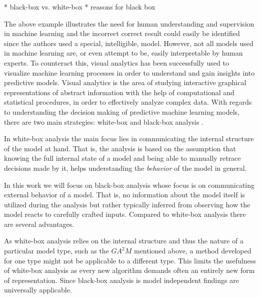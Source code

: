 * black-box vs. white-box
* reasons for black box

The above example illustrates the need for human understanding and supervision in machine learning and the incorrect correct result could easily be identified since the authors used a special, intelligible, model. However, not all models used in machine learning are, or even attempt to be, easily interpretable by human experts. To counteract this, visual analytics has been successfully used to visualize machine learning processes in order to understand and gain insights into predictive models. Visual analytics is the area of studying interactive graphical representations of abstract information with the help of computational and statistical procedures, in order to effectively analyze complex data. With regards to understanding the decision making of predictive machine learning models, there are two main strategies: white-box and black-box analysis \cite{class_signatures}.

In white-box analysis the main focus lies in communicating the internal structure of the model at hand. That is, the analysis is based on the assumption that knowing the full internal state of a model and being able to manually retrace decisions made by it, helps understanding the \emph{behavior} of the model in general.

In this work we will focus on black-box analysis whose focus is on communicating external behavior of a model. That is, no information about the model itself is utilized during the analysis but rather typically inferred from observing how the model reacts to carefully crafted inputs. Compared to white-box analysis there are several advantages.

As white-box analysis relies on the internal structure and thus the nature of a particular model type, such as the $GA^2M$ mentioned above, a method developed for one type might not be applicable to a different type. This limits the usefulness of white-box analysis as every new algorithm demands often an entirely new form of representation. Since black-box analysis is model independent findings are universally applicable.


